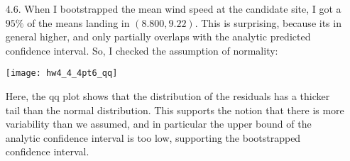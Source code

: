 \documentclass[11pt]{article}
\theoremstyle{definition}
\begin{document}
\begin{itemize}
\begin{itemize}
            \item[4.6.]
                When I bootstrapped the mean wind speed at the candidate site, I got a $95\%$ of the means landing in $(8.800,9.22)$. This is surprising, because its in general higher, and only partially overlaps with the analytic predicted confidence interval. So, I checked the assumption of normality:
                \begin{center}
                    \texttt{[image: hw4\_4\_4pt6\_qq]} 
                \end{center}
                Here, the qq plot shows that the distribution of the residuals has a thicker tail than the normal distribution. This supports the notion that there is more variability than we assumed, and in particular the upper bound of the analytic confidence interval is too low, supporting the bootstrapped confidence interval.
        \end{itemize}


\end{itemize}
\end{document}
